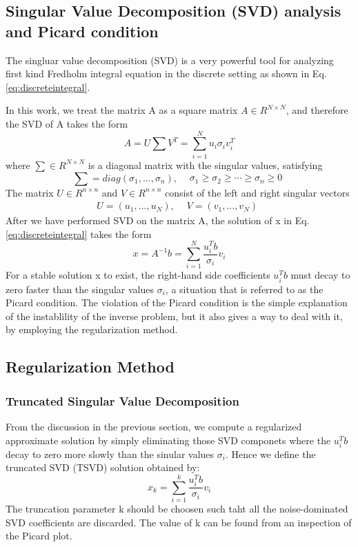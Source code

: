 \documentclass{article}
\begin{document}
\subsection{Singular Value Decomposition (SVD) analysis and Picard condition}
The singluar value decomposition (SVD) is a very powerful tool for analyzing
first kind Fredholm integral equation in the
discrete setting as shown in
Eq.\ref{eq:discreteintegral}\cite{trefethen1997numerical}.

In this work, we treat the matrix A as a square matrix \(A \in {R^{N \times
N}}\), and therefore the SVD of A takes the form
\begin{equation}
A = U\sum {V^T} = \sum\limits_{i = 1}^N {{u_i}{\sigma _i}v_i^T} 
\end{equation}
where \(\sum  \in {R^{N \times N}}\) is a diagonal matrix with the singular
values, satisfying
\[\sum  = diag({\sigma _1},...,{\sigma _n}),\begin{array}{*{20}{c}}
{}&{{\sigma _1} \ge {\sigma _2} \ge  \cdots  \ge {\sigma _n} \ge 0}
\end{array}\]
The matrix \(U \in {R^{n \times n}}\) and \(V \in {R^{n \times n}}\) consist of
the left and right singular vectors
\[U = ({u_1},...,{u_N}),\begin{array}{*{20}{c}}
{}&{V = ({v_1},...,{v_N})}
\end{array}\]
After we have performed SVD on the matrix A, the solution of x in
Eq.\ref{eq:discreteintegral} takes the form
\begin{equation}
x = {A^{ - 1}}b = \sum\limits_{i = 1}^N {\frac{{u_i^Tb}}{{{\sigma _i}}}{v_i}}
\end{equation}
For a stable solution x to exist, the right-hand side coefficients \(u_i^Tb\)
must decay to zero faster than the singular values \({\sigma _i}\), a situation
that is referred to as the Picard condition. The violation of the Picard
condition is the simple explanation of the instablility of the inverse problem,
but it also gives a way to deal with it, by employing the regularization method.
\subsection{Regularization Method}
\subsubsection{Truncated Singular Value Decomposition}
From the discussion in the previous section, we compute a regularized
approximate solution by simply eliminating those SVD componets where the
\(u_i^Tb\) decay to zero more slowly than the sinular values \({\sigma _i}\).
Hence we define the truncated SVD (TSVD) solution obtained by:
\begin{equation}
{x_k} = \sum\limits_{i = 1}^k {\frac{{u_i^Tb}}{{{\sigma _i}}}{v_i}}
\end{equation}
The truncation parameter k should be choosen such taht all the noise-dominated
SVD coefficients are discarded. The value of k can be found from an inspection
of the Picard plot.
\end{document}
